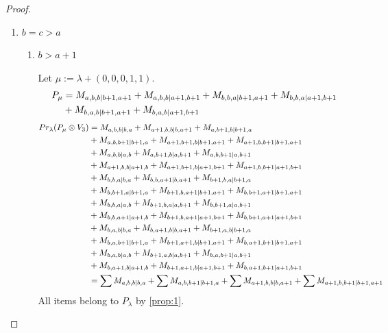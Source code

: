 \begin{proof}
\begin{enumerate}
    \item $b=c>a$
      \begin{enumerate}
        \item $b>a+1$ \par
        Let $\mu:=\lambda + (0,0,0,1,1) $.
        \begin{equation}\notag
          \begin{aligned}
            P_\mu &= M_{a,b,b|b+1,a+1}
+ M_{a,b,b|a+1,b+1}
+ M_{b,b,a|b+1,a+1}
+ M_{b,b,a|a+1,b+1} \\
                  &
+ M_{b,a,b|b+1,a+1}
+ M_{b,a,b|a+1,b+1}
          \end{aligned}
        \end{equation}
        \begin{equation}\notag
          \begin{aligned}
            Pr_{\lambda}(P_\mu \otimes V_{3}) &=
M_{a,b,b|b,a}
+ M_{a+1,b,b|b,a+1}
+ M_{a,b+1,b|b+1,a}\\
                                               &
+ M_{a,b,b+1|b+1,a}
+ M_{a+1,b+1,b|b+1,a+1}
+ M_{a+1,b,b+1|b+1,a+1}\\
                                               &
+ M_{a,b,b|a,b}
+ M_{a,b+1,b|a,b+1}
+ M_{a,b,b+1|a,b+1}\\
                                               &
+ M_{a+1,b,b|a+1,b}
+ M_{a+1,b+1,b|a+1,b+1}
+ M_{a+1,b,b+1|a+1,b+1}\\
                                               &
+ M_{b,b,a|b,a}
+ M_{b,b,a+1|b,a+1}
+ M_{b+1,b,a|b+1,a}\\
                                               &
+ M_{b,b+1,a|b+1,a}
+ M_{b+1,b,a+1|b+1,a+1}
+ M_{b,b+1,a+1|b+1,a+1}\\
                                               &
+ M_{b,b,a|a,b}
+ M_{b+1,b,a|a,b+1}
+ M_{b,b+1,a|a,b+1}\\
                                               &
+ M_{b,b,a+1|a+1,b}
+ M_{b+1,b,a+1|a+1,b+1}
+ M_{b,b+1,a+1|a+1,b+1}\\
                                               &
+ M_{b,a,b|b,a}
+ M_{b,a+1,b|b,a+1}
+ M_{b+1,a,b|b+1,a}\\
                                               &
+ M_{b,a,b+1|b+1,a}
+ M_{b+1,a+1,b|b+1,a+1}
+ M_{b,a+1,b+1|b+1,a+1}\\
                                               &
+ M_{b,a,b|a,b}
+ M_{b+1,a,b|a,b+1}
+ M_{b,a,b+1|a,b+1}\\
                                               &
+ M_{b,a+1,b|a+1,b}
+ M_{b+1,a+1,b|a+1,b+1}
+ M_{b,a+1,b+1|a+1,b+1} \\
                                               &=
\sum M_{a,b,b|b,a}
+ \sum M_{a,b,b+1|b+1,a}
+ \sum M_{a+1,b,b|b,a+1}
+ \sum M_{a+1,b,b+1|b+1,a+1}
          \end{aligned}
        \end{equation}
All items belong to $P_\lambda$ by \cref{prop:1}.
        

\end{enumerate}
\end{enumerate}
\end{proof}
